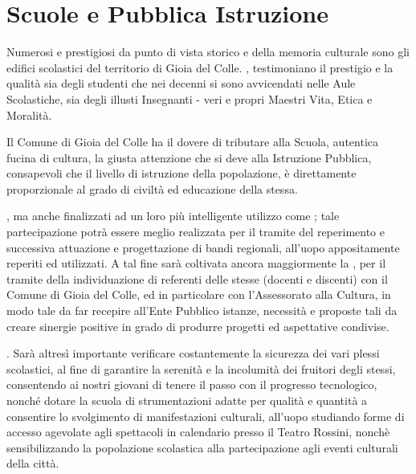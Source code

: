 \documentclass[a4paper,14pt,italian]{sphinxmanual}
\begin{document}
\chapter{Scuole e Pubblica Istruzione}
\label{\detokenize{scuola:scuole-e-pubblica-istruzione}}\label{\detokenize{scuola::doc}}
Numerosi e prestigiosi da punto di vista storico e della memoria culturale sono gli edifici scolastici del territorio di Gioia del Colle.
, testimoniano il prestigio e la qualità sia degli studenti che nei decenni si sono avvicendati nelle Aule Scolastiche, sia degli illusti Insegnanti - veri e propri Maestri Vita, Etica e Moralità.

Il Comune di Gioia del Colle ha il dovere di tributare alla Scuola, autentica fucina di cultura, la giusta attenzione che si deve alla Istruzione Pubblica, consapevoli che il livello di istruzione della popolazione, è direttamente proporzionale al grado di civiltà ed educazione della stessa.

, ma anche finalizzati ad un loro più intelligente utilizzo come ; tale partecipazione potrà essere meglio realizzata per il tramite del reperimento e successiva attuazione e progettazione di bandi regionali, all’uopo appositamente reperiti ed utilizzati.
A tal fine sarà coltivata ancora maggiormente la , per il tramite della individuazione di referenti delle stesse (docenti e discenti) con il Comune di Gioia del Colle, ed in particolare con l’Assessorato alla Cultura, in modo tale da far recepire all’Ente Pubblico istanze, necessità e proposte tali da creare sinergie positive in grado di produrre progetti ed aspettative condivise.

.
Sarà altresì importante verificare costantemente la sicurezza dei vari plessi scolastici, al fine di garantire la serenità e la incolumità dei fruitori degli stessi,  consentendo ai nostri giovani di tenere il passo con il progresso tecnologico, nonché dotare la scuola di strumentazioni adatte per qualità e quantità a consentire lo svolgimento di manifestazioni culturali, all’uopo studiando forme di accesso agevolate agli spettacoli in calendario presso il Teatro Rossini, nonchè sensibilizzando la popolazione scolastica alla partecipazione agli eventi culturali della città.
\end{document}

